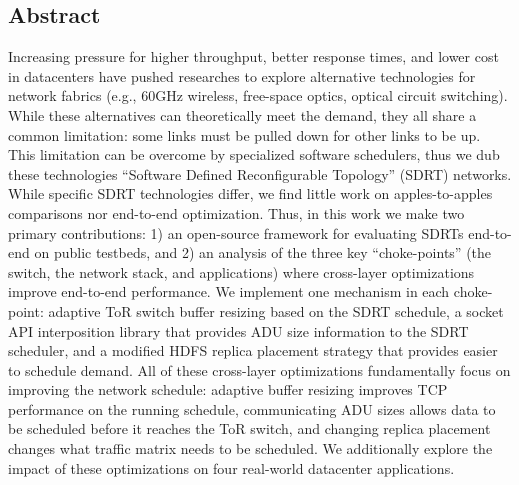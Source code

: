 \subsection*{Abstract}
Increasing pressure for higher throughput, better response times, and lower cost
in datacenters have pushed researches to explore alternative technologies for
network fabrics (e.g., 60GHz wireless, free-space optics, optical circuit
switching). While these alternatives can theoretically meet the demand, they all
share a common limitation: some links must be pulled down for other links to be
up. This limitation can be overcome by specialized software schedulers, thus we
dub these technologies ``Software Defined Reconfigurable Topology'' (SDRT)
networks. While specific SDRT technologies differ, we find little work on
apples-to-apples comparisons nor end-to-end optimization. Thus, in this work we
make two primary contributions: 1) an open-source framework for evaluating SDRTs
end-to-end on public testbeds, and 2) an analysis of the three key
``choke-points'' (the switch, the network stack, and applications) where
cross-layer optimizations improve end-to-end performance. We implement one
mechanism in each choke-point: adaptive ToR switch buffer resizing based on the
SDRT schedule, a socket API interposition library that provides ADU size
information to the SDRT scheduler, and a modified HDFS replica placement
strategy that provides easier to schedule demand. All of these cross-layer
optimizations fundamentally focus on improving the network schedule: adaptive
buffer resizing improves TCP performance on the running schedule, communicating
ADU sizes allows data to be scheduled before it reaches the ToR switch, and
changing replica placement changes what traffic matrix needs to be scheduled.
We additionally explore the impact of these optimizations on four real-world
datacenter applications.




